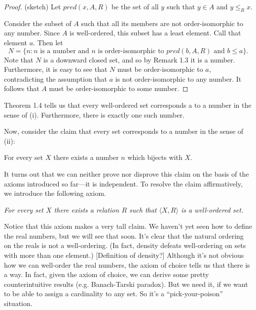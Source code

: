 \documentclass[english,course]{Notes}
\begin{document}
\begin{proof}{(sketch)}
Let $pred(x, A, R)$ be the set of all $y$ such that $y \in A$ and $y \leq_R 
x$. 


Consider the subset of $A$ such that all its members 
are not order-isomorphic to any number. Since $A$ is well-ordered, this subset 
has a least element. Call that element $a$. Then let 
$$N = \{n: n \text{ is a number and } n \text{ is order-isomorphic to } pred(b, A, 
R) \text{ and } b \leq a\}.$$  
Note that $N$ is a downward closed set, and so by Remark 1.3 it is a number. 
Furthermore, it is easy to see that $N$ must be order-isomorphic to $a$, 
contradicting the assumption that $a$ is not order-isomorphic to any number. It 
follows that $A$ must be order-isomorphic to some number.  
\end{proof}

Theorem 1.4 tells us that every well-ordered set corresponds a to a number in 
the sense of (i). Furthermore, there is exactly one such number.
 
Now, consider the claim that every set corresponds to a number in 
the sense of (ii): 

\begin{claim} 
For every set $X$ there exists a number $n$ which bijects 
with $X$. 
\end{claim}

It turns out that we can neither prove nor disprove this claim on the 
basis of the axioms introduced so far---it is independent. To resolve 
the claim affirmatively, we introduce the following axiom. 

\medskip

{\sl For every set $X$ there exists a relation $R$ such that
$\langle X, R\rangle$ is a well-ordered set.}

\medskip

Notice that this axiom makes a very tall claim. We haven't yet seen how to define the real 
numbers, but we will see that soon. It's clear that the natural ordering on the 
reals is not a well-ordering. (In fact, density defeats well-ordering on sets 
with more than one element.) [Definition of density?] 
Although it's not obvious how we can well-order 
the real numbers, the axiom of choice tells us that there is a way. In fact, 
given the axiom of choice, we can derive some pretty counterintuitive results (e.g. 
Banach-Tarski paradox). But we need it, if we want to be able to assign a 
cardinality to any set. So it's a ``pick-your-poison'' situation.   
\end{document}
